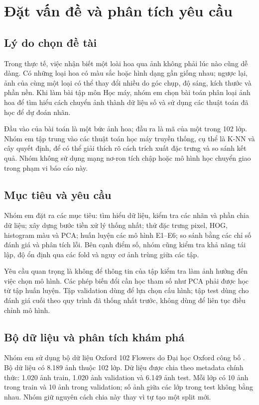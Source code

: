 \chapter{Đặt vấn đề và phân tích yêu cầu}
\section{Lý do chọn đề tài}
Trong thực tế, việc nhận biết một loài hoa qua ảnh không phải lúc nào cũng dễ dàng. Có những loại hoa có màu sắc hoặc hình dạng gần giống nhau; ngược lại, ảnh của cùng một loại có thể thay đổi nhiều do góc chụp, độ sáng, kích thước và phần nền. Khi làm bài tập môn Học máy, nhóm em chọn bài toán phân loại ảnh hoa để tìm hiểu cách chuyển ảnh thành dữ liệu số và sử dụng các thuật toán đã học để dự đoán nhãn.

Đầu vào của bài toán là một bức ảnh hoa; đầu ra là mã của một trong 102 lớp. Nhóm em tập trung vào các thuật toán học máy truyền thống, cụ thể là K-NN và cây quyết định, để có thể giải thích rõ cách trích xuất đặc trưng và so sánh kết quả. Nhóm không sử dụng mạng nơ-ron tích chập hoặc mô hình học chuyển giao trong phạm vi báo cáo này.
\section{Mục tiêu và yêu cầu}
Nhóm em đặt ra các mục tiêu: tìm hiểu dữ liệu, kiểm tra các nhãn và phần chia dữ liệu; xây dựng bước tiền xử lý thống nhất; thử đặc trưng pixel, HOG, histogram màu và PCA; huấn luyện các mô hình E1–E6; so sánh bằng các chỉ số đánh giá và phân tích lỗi. Bên cạnh điểm số, nhóm cũng kiểm tra khả năng tái lập, độ ổn định qua các fold và nguy cơ ảnh trùng giữa các tập.

Yêu cầu quan trọng là không để thông tin của tập kiểm tra làm ảnh hưởng đến việc chọn mô hình. Các phép biến đổi cần học tham số như PCA phải được học từ tập huấn luyện. Tập validation dùng để lựa chọn cấu hình; tập test dùng cho đánh giá cuối theo quy trình đã thống nhất trước, không dùng để liên tục điều chỉnh mô hình.
\section{Bộ dữ liệu và phân tích khám phá}
Nhóm em sử dụng bộ dữ liệu Oxford 102 Flowers do Đại học Oxford công bố \cite{oxford,nilsback}. Bộ dữ liệu có 8.189 ảnh thuộc 102 lớp. Dữ liệu được chia theo metadata chính thức: 1.020 ảnh train, 1.020 ảnh validation và 6.149 ảnh test. Mỗi lớp có 10 ảnh trong train và 10 ảnh trong validation; số ảnh giữa các lớp trong test không bằng nhau. Nhóm giữ nguyên cách chia này thay vì tự tạo một split mới.

